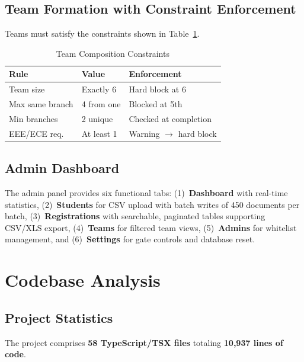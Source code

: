 \documentclass[conference]{IEEEtran}
\begin{document}
\subsection{Team Formation with Constraint Enforcement}

Teams must satisfy the constraints shown in Table~\ref{tab:constraints}.

\begin{table}[htbp]
\centering
\caption{Team Composition Constraints}
\label{tab:constraints}
\footnotesize
\renewcommand{\arraystretch}{1.15}
\begin{tabular}{@{}lll@{}}
\toprule
\textbf{Rule} & \textbf{Value} & \textbf{Enforcement} \\
\midrule
Team size & Exactly 6 & Hard block at 6 \\
Max same branch & 4 from one & Blocked at 5th \\
Min branches & 2 unique & Checked at completion \\
EEE/ECE req. & At least 1 & Warning $\to$ hard block \\
\bottomrule
\end{tabular}
\end{table}

\subsection{Admin Dashboard}

The admin panel provides six functional tabs: (1)~\textbf{Dashboard} with real-time statistics, (2)~\textbf{Students} for CSV upload with batch writes of 450 documents per batch, (3)~\textbf{Registrations} with searchable, paginated tables supporting CSV/XLS export, (4)~\textbf{Teams} for filtered team views, (5)~\textbf{Admins} for whitelist management, and (6)~\textbf{Settings} for gate controls and database reset.

\section{Codebase Analysis}

\subsection{Project Statistics}

The project comprises \textbf{58 TypeScript/TSX files} totaling \textbf{10,937 lines of code}.
\end{document}
